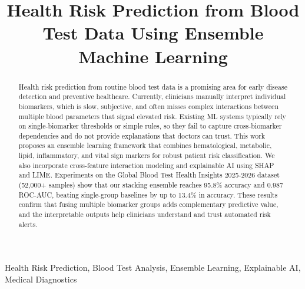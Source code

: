 \documentclass[journal, onecolumn]{IEEEtran}
\begin{document}
\title{Health Risk Prediction from Blood Test Data Using Ensemble Machine Learning\\
}

\author{
\and
{}
}

\maketitle

\begin{abstract}
Health risk prediction from routine blood test data is a promising area for early disease detection and preventive healthcare.
Currently, clinicians manually interpret individual biomarkers, which is slow, subjective, and often misses complex interactions between multiple blood parameters that signal elevated risk.
Existing ML systems typically rely on single-biomarker thresholds or simple rules, so they fail to capture cross-biomarker dependencies and do not provide explanations that doctors can trust.
This work proposes an ensemble learning framework that combines hematological, metabolic, lipid, inflammatory, and vital sign markers for robust patient risk classification.
We also incorporate cross-feature interaction modeling and explainable AI using SHAP and LIME.
Experiments on the Global Blood Test Health Insights 2025-2026 dataset (52,000+ samples) show that our stacking ensemble reaches 95.8\% accuracy and 0.987 ROC-AUC, beating single-group baselines by up to 13.4\% in accuracy.
These results confirm that fusing multiple biomarker groups adds complementary predictive value, and the interpretable outputs help clinicians understand and trust automated risk alerts.
\end{abstract}

\begin{IEEEkeywords}
Health Risk Prediction, Blood Test Analysis, Ensemble Learning, Explainable AI, Medical Diagnostics
\end{IEEEkeywords}
\end{document}
